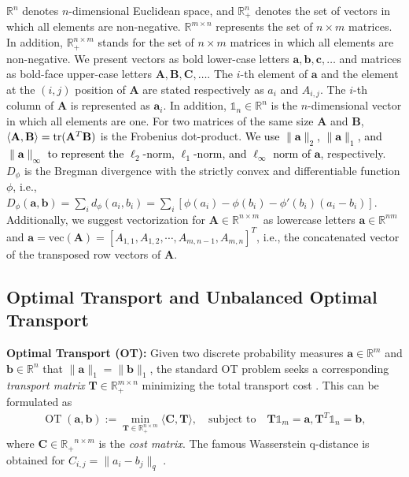 \documentclass[11pt]{article}
\newcommand{\R}{\mathbb{R}}
\newcommand{\one}{\mathds{1}}
\newcommand{\mat}[1]{\mathbf{#1}}
\renewcommand{\vec}[1]{\bm{#1}}
\newcommand{\changeXSS}[1]{\textcolor{black}{#1}}
\begin{document}
$\mathbb{R}^n$ denotes $n$-dimensional Euclidean space, and $\mathbb{R}^n_+$ denotes the set of vectors in which all elements are non-negative. $\mathbb{R}^{m \times n}$ represents the set of $n \times m$ matrices. In addition, $\mathbb{R}^{n \times m}_+$ stands for the set of $n \times m$ matrices in which all elements are non-negative. We present vectors as bold lower-case letters $\vec{a},\vec{b},\vec{c},\dots$ and matrices as bold-face upper-case letters $\mat{A},\mat{B},\mat{C},\dots$. The $i$-th element of $\vec{a}$ and the element at the $(i,j)$ position of $\mat{A}$ are stated respectively as $a_i$ and ${A}_{i,j}$. The $i$-th column of $\mat{A}$ is represented as $\vec{a}_i$. In addition, $\one_n \in \mathbb{R}^n$ is the $n$-dimensional vector in which all elements are one. For two matrices of the same size $\mat{A}$ and $\mat{B}$, $\langle \mat{A},\mat{B}\rangle={\rm tr}(\mat{A}^T\mat{B})$ is the Frobenius dot-product. \changeXSS{We use $\|\vec{a}\|_2$, $\|\vec{a}\|_1$, and $\|\vec a\|_{\infty}$ to represent the $\ell_2$-norm, $\ell_1$-norm, and $\ell_{\infty}$ norm of $\vec{a}$}, respectively. $D_\phi$ is the Bregman divergence with the strictly convex and differentiable function $\phi$, i.e., $D_\phi(\vec{a},\vec{b})=\sum_{i} d_\phi(a_i, b_i)=\sum_i [\phi(a_i) - \phi(b_i) - \phi'(b_i)(a_i -b_i)]$. Additionally, we suggest vectorization for $\mat{A} \in \mathbb{R}^{n \times m}$ as lowercase letters $\vec{a} \in \mathbb{R}^{nm}$ and $\vec{a}=\text{vec}(\mat{A})=[{A}_{1,1}, {A}_{1,2}, \cdots, {A}_{m,n-1}, {A}_{m,n}]^T$, i.e., the concatenated vector of the transposed row vectors of $\mat{A}$.

\subsection{Optimal Transport and Unbalanced Optimal Transport}
\label{Sec:2.1}
{\bf Optimal Transport (OT):} Given two discrete probability measures $\vec{a}\in \R^{m}$ and $\vec{b} \in \R^{n}$ that $\|\vec{a}\|_1 = \|\vec{b}\|_1$, the standard OT problem seeks a corresponding {\it transport matrix} $\mat{T} \in \R_{+}^{m \times n}$ minimizing the total transport cost \cite{Kantorovich_1942}. This can be formulated as
\begin{eqnarray}
\label{Eq:Standard_OT}
\operatorname{OT}(\vec{a},\vec{b}) := \min_{ \mat{T} \in \R_{+}^{n \times m}} \langle \mat{C}, \mat{T} \rangle, \quad
\text{subject\ to} \quad \mat{T} \one_m= \vec{a}, \mat{T}^{T}\one_n = \vec{b},
\end{eqnarray}
where $\mat{C} \in \mathbb{R_{+}}^{n \times m}$ is the {\it cost matrix}. The famous Wasserstein q-distance is obtained for  $C_{i,j} = \|a_i - b_j\|_q$ \cite{Villani_2008_OTBook}.
\end{document}
